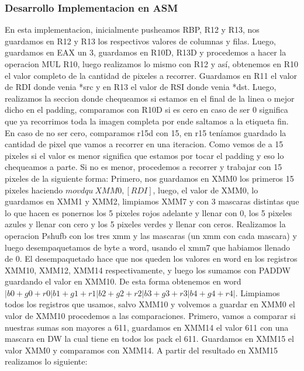 \subsubsection{Desarrollo Implementacion en ASM}
En esta implementacion, inicialmente pusheamos RBP, R12 y R13, nos guardamos en R12 y R13 los respectivos valores de columnas y filas.\newline
Luego, guardamos en EAX un 3, guardamos en R10D, R13D y procedemos a hacer la operacion MUL R10, luego realizamos lo mismo con R12 y así,
obtenemos en R10 el valor completo de la cantidad de pixeles a recorrer.\newline
Guardamos en R11 el valor de RDI donde venia *src y en R13 el valor de RSI donde venia *dst. \newline
Luego, realizamos la seccion donde chequeamos si estamos en el final de la linea o mejor dicho en el padding, comparamos con R10D si es cero \newline
en caso de ser 0 significa que ya recorrimos toda la imagen completa por ende saltamos a la etiqueta fin. \newline
En caso de no ser cero, comparamos r15d con 15, en r15 teníamos guardado la cantidad de pixel que vamos a recorrer en una iteracion.
Como vemos de a 15 pixeles si el valor es menor significa que estamos por tocar el padding y eso lo chequeamos a parte. \newline
Si no es menor, procedemos a recorrer y trabajar con 15 pixeles de la siguiente forma: \newline
Primero, nos guardamos en XMM0 los primeros 15 pixeles haciendo $ movdqu\  XMM0, [RDI]$, luego, el valor de XMM0,
lo guardamos en XMM1 y XMM2, limpiamos XMM7 y con 3 mascaras distintas que lo que hacen es ponernos los 5 pixeles rojos adelante y llenar con 0, 
los 5 pixeles azules y llenar con cero y los 5 pixeles verdes y llenar con ceros. \newline
Realizamos la operacion Pshufb con los tres xmm y las mascaras (un xmm con cada mascara) y luego desempaquetamos de byte a word,
usando el xmm7 que habiamos llenado de 0. \newline
El desempaquetado hace que nos queden los valores en word en los registros XMM10, XMM12, XMM14 respectivamente, y luego
los sumamos con PADDW guardando el valor en XMM10. De esta forma obtenemos en word 
$|b0 + g0 + r0|b1 + g1 + r1|b2 + g2 + r2|b3 + g3 + r3|b4 + g4 + r4|$. \newline
Limpiamos todos los registros que usamos, salvo XMM10 y volvemos a guardar en XMM0 el valor de XMM10 procedemos a las comparaciones.
Primero, vamos a comparar si nuestras sumas son mayores a 611, guardamos en XMM14 el valor 611 con una mascara en DW la cual tiene en todos los pack
el 611. Guardamos en XMM15 el valor XMM0 y comparamos con XMM14.
A partir del resultado en XMM15 realizamos lo siguiente:\newline

